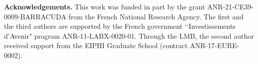 \documentclass[a4paper]{amsart}
\theoremstyle{definition}
\theoremstyle{remark}
\begin{document}
\bigskip

\noindent
\textbf{Acknowledgements.} %
This work was funded in part by the grant ANR-21-CE39-0009-BARRACUDA from the French National Research Agency. The first and the third authors are supported by the French government ‘‘Investissements d’Avenir" program ANR-11-LABX-0020-01. Through the LMB, the second author received support from the  EIPHI Graduate School (contract ANR-17-EURE-0002).




\end{document}
